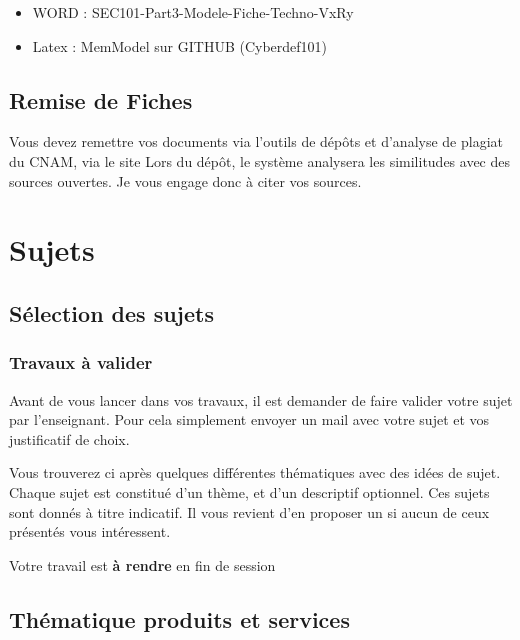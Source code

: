 \begin{itemize}
  \item WORD : SEC101-Part3-Modele-Fiche-Techno-VxRy
  \item Latex :  MemModel sur GITHUB (Cyberdef101)
\end{itemize}

\subsection{Remise de Fiches}

Vous devez remettre vos documents via l'outils de dépôts et d'analyse de plagiat du CNAM, via le site 
Lors du dépôt, le système analysera les similitudes avec des sources ouvertes. Je vous engage donc à citer vos sources.

\section{Sujets}


\subsection{Sélection des sujets}

\begin{frame}
\frametitle<presentation>{Travaux à valider}
Avant de vous lancer dans vos travaux, il est demander de faire valider votre sujet par l'enseignant. Pour cela simplement envoyer un mail avec votre sujet et vos justificatif de choix.

Vous trouverez ci après quelques différentes thématiques avec des idées de sujet. Chaque sujet est constitué d'un thème, et d'un descriptif optionnel.
Ces sujets sont donnés à titre indicatif. Il vous revient d'en proposer un si aucun de ceux présentés vous intéressent.

Votre travail est \textbf{à rendre} en fin de session

\end{frame}


\subsection{Thématique produits et services}

